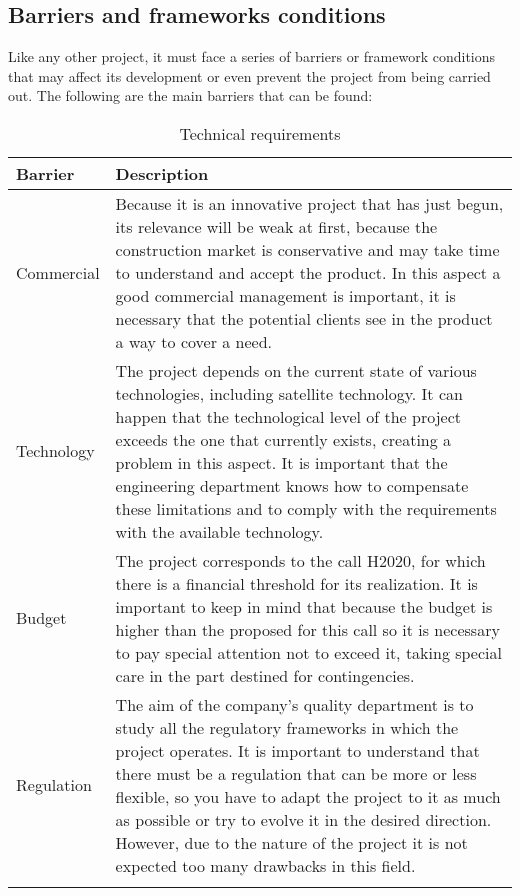 \subsection{Barriers and frameworks conditions}

Like any other project, it must face a series of barriers or framework conditions that may affect its development or even prevent the project from being carried out. The following are the main barriers that can be found:

\begin{longtable}[H]{l p{12cm}}
		
		\toprule[2pt]
		
		\textbf{Barrier} &  \textbf{Description}\\
		
		\midrule [1.5pt]
		
		Commercial & Because it is an innovative project that has just begun, its relevance will be weak at first, because the construction market is conservative and may take time to understand and accept the product.
		In this aspect a good commercial management is important, it is necessary that the potential clients see in the product a way to cover a need.
		\vspace{0.2cm}\\
		
		\midrule
		
		Technology & The project depends on the current state of various technologies, including satellite technology. It can happen that the technological level of the project exceeds the one that currently exists, creating a problem in this aspect. It is important that the engineering department knows how to compensate these limitations and to comply with the requirements with the available technology.\vspace{0.2cm}\\
		
		\midrule
		
		Budget & The project corresponds to the call H2020, for which there is a financial threshold for its realization. It is important to keep in mind that because the budget is higher than the proposed for this call so it is necessary to pay special attention not to exceed it, taking special care in the part destined for contingencies.\vspace{0.2cm}\\
		
		\midrule
		
		Regulation & The aim of the company's quality department is to study all the regulatory frameworks in which the project operates. It is important to understand that there must be a regulation that can be more or less flexible, so you have to adapt the project to it as much as possible or try to evolve it in the desired direction. However, due to the nature of the project it is not expected too many drawbacks in this field.\vspace{0.2cm}\\
		
		
		\bottomrule[2pt]
		
	\caption{Technical requirements}
\end{longtable}